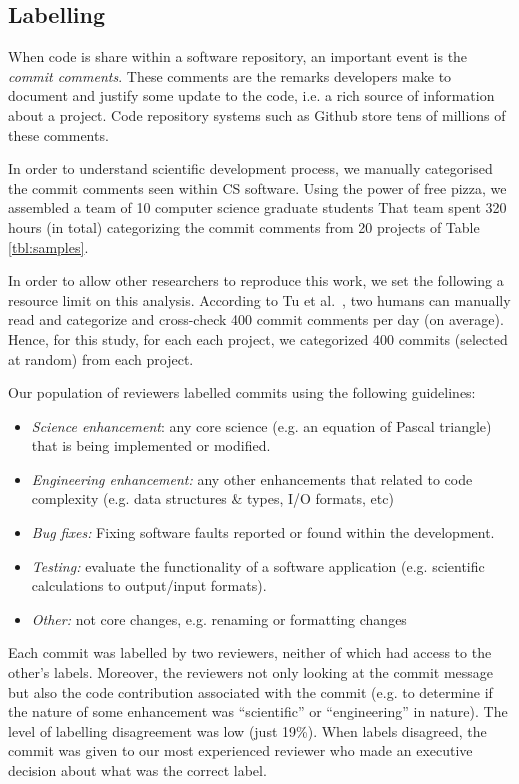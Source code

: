\documentclass[sigconf,review,anonymous]{acmart}
\newcommand{\bi}{\begin{itemize}}
\newcommand{\ei}{\end{itemize}}
\begin{document}
 \subsection{Labelling}
 When code is share
 within a software  repository, an important event is the {\em commit comments}.  These comments are the remarks developers make to document and justify some update to the code, i.e. a rich source of information about a project. Code repository systems such as Github store tens of millions of these comments. 
 
 In order to understand scientific development process, we manually categorised
 the   commit comments seen within CS
 software. 
Using the power of free pizza, we assembled a team of 10 computer science 
graduate students
That  team spent  320 hours (in total) categorizing 
 the commit comments from 20 projects of Table \ref{tbl:samples}.

 In order to allow other researchers to reproduce this work, we set
 the following
 a resource limit on  this analysis.
 According to Tu et al.~\cite{tu2019better}, two humans can manually read and categorize
 and cross-check 400 commit comments per day (on average).
Hence, for this study, for each each project, we categorized 400 commits
(selected at random) from each project. 

 
 Our population of reviewers
 labelled commits using the following
 guidelines:
 \bi
 \item {\em Science enhancement}: any core science (e.g. an equation of Pascal triangle) that is being implemented or modified.
 \item {\em Engineering enhancement:} any other enhancements that related to code complexity (e.g.  data structures \& types, I/O formats, etc) 
\item {\em  Bug fixes:}  Fixing software faults reported or found within the development. 
\item {\em Testing: } evaluate the functionality of a software application (e.g. scientific calculations to output/input formats).
\item
{\em  Other:}  not core changes, e.g. renaming or formatting changes
\ei
Each commit was labelled by two reviewers,
neither of which had access to the other's labels. Moreover, the reviewers not only looking at the commit message but also the code contribution associated with the commit (e.g. to determine if the nature of some enhancement was 
``scientific'' or ``engineering'' in nature). The level of
labelling disagreement was low (just 19\%). When labels disagreed, the commit was given to our most experienced reviewer who made an executive decision about what
was the correct label. 
\end{document}
